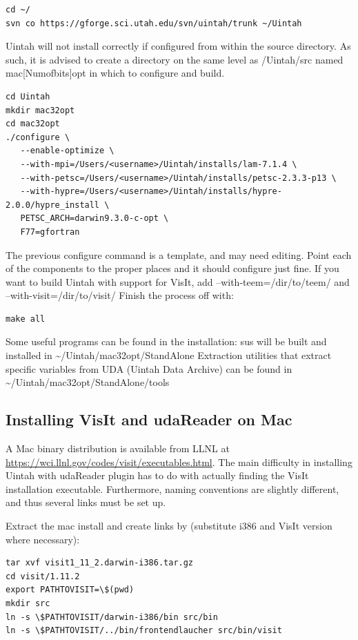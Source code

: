 \documentclass[12pt]{article}
\begin{document}
\begin{verbatim}
cd ~/
svn co https://gforge.sci.utah.edu/svn/uintah/trunk ~/Uintah
\end{verbatim}

Uintah will not install correctly if configured from within the source
directory.  As such, it is advised to create a directory on the same
level as /Uintah/src named mac[Numofbits]opt in which to configure and
build.

\begin{verbatim}
cd Uintah
mkdir mac32opt
cd mac32opt
./configure \
   --enable-optimize \
   --with-mpi=/Users/<username>/Uintah/installs/lam-7.1.4 \
   --with-petsc=/Users/<username>/Uintah/installs/petsc-2.3.3-p13 \
   --with-hypre=/Users/<username>/Uintah/installs/hypre-2.0.0/hypre_install \
   PETSC_ARCH=darwin9.3.0-c-opt \
   F77=gfortran
\end{verbatim}

The previous configure command is a template, and may need editing.
Point each of the components to the proper places and it should
configure just fine.  If you want to build Uintah with support for
VisIt, add --with-teem=/dir/to/teem/ and --with-visit=/dir/to/visit/
Finish the process off with:

\begin{verbatim}
make all
\end{verbatim}
  

Some useful programs can be found in the installation: sus will be
built and installed in \textasciitilde/Uintah/mac32opt/StandAlone
Extraction utilities that extract specific variables from UDA (Uintah
Data Archive) can be found in
\textasciitilde/Uintah/mac32opt/StandAlone/tools

\subsection{Installing VisIt and udaReader on Mac}

A Mac binary distribution is available from LLNL at
\url{https://wci.llnl.gov/codes/visit/executables.html}.  The main
difficulty in installing Uintah with udaReader plugin has to do with
actually finding the VisIt installation executable.  Furthermore,
naming conventions are slightly different, and thus several links must
be set up.

Extract the mac install and create links by (substitute i386 and VisIt
version where necessary):

\begin{verbatim}
tar xvf visit1_11_2.darwin-i386.tar.gz
cd visit/1.11.2
export PATHTOVISIT=\$(pwd)
mkdir src
ln -s \$PATHTOVISIT/darwin-i386/bin src/bin
ln -s \$PATHTOVISIT/../bin/frontendlaucher src/bin/visit
\end{verbatim}
\end{document}
